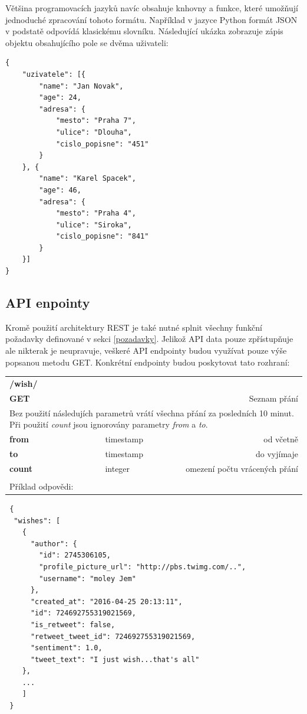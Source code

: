 \documentclass[thesis=B,czech]{FITthesis}[2012/06/26]
\begin{document}
	Většina programovacích jazyků navíc obsahuje knhovny a funkce, které umožňují jednoduché zpracování tohoto formátu. Například v jazyce Python formát JSON v podstatě odpovídá klasickému slovníku. Následující ukázka zobrazuje zápis objektu obsahujícího pole se dvěma uživateli:
\begin{lstlisting}
{
	"uzivatele": [{
		"name": "Jan Novak",
		"age": 24,
		"adresa": {
			"mesto": "Praha 7",
			"ulice": "Dlouha",
			"cislo_popisne": "451"
		}
	}, {
		"name": "Karel Spacek",
		"age": 46,
		"adresa": {
			"mesto": "Praha 4",
			"ulice": "Siroka",
			"cislo_popisne": "841"
		}
	}]
}
\end{lstlisting}
	
\subsection{API enpointy}
	Kromě použití architektury REST je také nutné splnit všechny funkční požadavky definované v sekci \ref{pozadavky}. Jelikož API data pouze zpřístupňuje ale nikterak je neupravuje, veškeré API endpointy budou využívat pouze výše popsanou metodu GET. Konkrétní endpointy budou poskytovat tato rozhraní:
	

\begin{table}[h]
\begin{tabular}{llllr}
\rowcolor[HTML]{EFEFEF}
\large \textbf{/wish/}        &         &                 &        & \multicolumn{1}{l}{}                \\
\rowcolor[HTML]{EFEFEF}
\textbf{GET}          &         &                 &        & Seznam přání                        \\
\multicolumn{5}{l}{\parbox[t]{12.8cm}{Bez použití následujích parametrů vrátí všechna přání za posledních 10 minut. Při použití \textit{count} jsou ignorovány parametry  \textit{from} a \textit{to}.}  } \\
\textbf{from}         &         & timestamp       &        & od včetně                           \\
\textbf{to}           &         & timestamp       &        & do vyjímaje                         \\
\textbf{count}        &         & integer         &        & omezení počtu vrácených přání      \\
 & & & & \\
 Příklad odpovědi:
\end{tabular}
\end{table}

\begin{lstlisting}
 {
  "wishes": [
    {
      "author": {
        "id": 2745306105,
        "profile_picture_url": "http://pbs.twimg.com/..",
        "username": "moley Jem"
      },
      "created_at": "2016-04-25 20:13:11",
      "id": 724692755319021569,
      "is_retweet": false,
      "retweet_tweet_id": 724692755319021569,
      "sentiment": 1.0,
      "tweet_text": "I just wish...that's all"
    },
    ...
    ]
 }
\end{lstlisting} 
\end{document}
